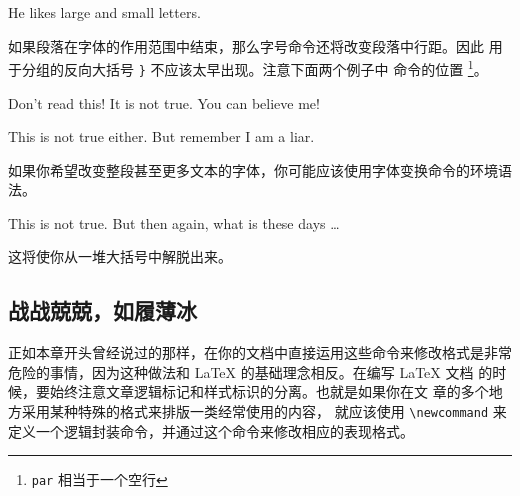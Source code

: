 \begin{example}
He likes {\LARGE large and
{\small small} letters}.
\end{example}

如果段落在字体的作用范围中结束，那么字号命令还将改变段落中行距。因此
用于分组的反向大括号 \verb|}| 不应该太早出现。注意下面两个例子中
 命令的位置
\footnote{\texttt{\bs{}par} 相当于一个空行}。

\begin{example}
{\Large Don't read this!
 It is not true.
 You can believe me!\par}
\end{example}

\begin{example}
{\Large This is not true either.
But remember I am a liar.}\par
\end{example}

如果你希望改变整段甚至更多文本的字体，你可能应该使用字体变换命令的环境语法。

\begin{example}
\begin{Large}
This is not true.
But then again, what is these
days \ldots
\end{Large}
\end{example}

\noindent 这将使你从一堆大括号中解脱出来。

\subsection{战战兢兢，如履薄冰}

正如本章开头曾经说过的那样，在你的文档中直接运用这些命令来修改格式是非常
危险的事情，因为这种做法和 \LaTeX{} 的基础理念相反。在编写 \LaTeX{} 文档
的时候，要始终注意文章逻辑标记和样式标识的分离。也就是如果你在文
章的多个地方采用某种特殊的格式来排版一类经常使用的内容，
就应该使用 \verb|\newcommand| 来定义一个逻辑封装命令，并通过这个命令来修改相应的表现格式。


